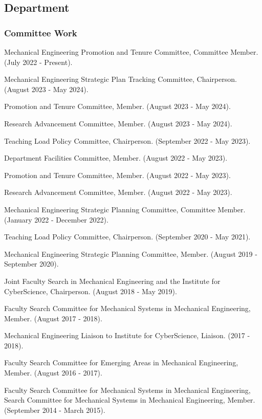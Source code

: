 \documentclass[a4paper,10pt]{article}
\begin{document}
\subsection*{Department}

\hspace{1cm}\subsubsection*{Committee Work}

Mechanical Engineering Promotion and Tenure Committee, Committee Member. (July 2022 - Present).

Mechanical Engineering Strategic Plan Tracking Committee, Chairperson. (August 2023 - May 2024).

Promotion and Tenure Committee, Member. (August 2023 - May 2024).

Research Advancement Committee, Member. (August 2023 - May 2024).

Teaching Load Policy Committee, Chairperson. (September 2022 - May 2023).

Department Facilities Committee, Member. (August 2022 - May 2023).

Promotion and Tenure Committee, Member. (August 2022 - May 2023).

Research Advancement Committee, Member. (August 2022 - May 2023).

Mechanical Engineering Strategic Planning Committee, Committee Member. (January 2022 - December 2022).

Teaching Load Policy Committee, Chairperson. (September 2020 - May 2021).

Mechanical Engineering Strategic Planning Committee, Member. (August 2019 - September 2020).

Joint Faculty Search in Mechanical Engineering and the Institute for CyberScience, Chairperson. (August 2018 - May 2019).

Faculty Search Committee for Mechanical Systems in Mechanical Engineering, Member. (August 2017 - 2018).

Mechanical Engineering Liaison to Institute for CyberScience, Liaison. (2017 - 2018).

Faculty Search Committee for Emerging Areas in Mechanical Engineering, Member. (August 2016 - 2017).

Faculty Search Committee for Mechanical Systems in Mechanical Engineering, Search Committee for Mechanical Systems in Mechanical Engineering, Member. (September 2014 - March 2015).
\end{document}
